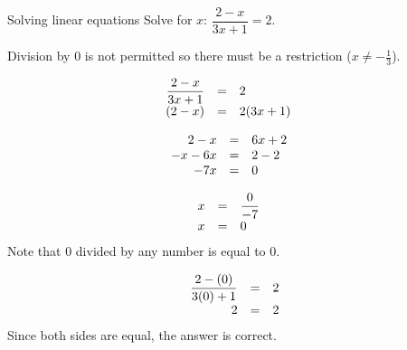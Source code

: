 \begin{wex}{Solving linear equations }
{Solve for $x$: $\dfrac{2-x}{3x+1}=2$.} 
{
Division by $0$ is not permitted so there must be a restriction ($x\neq -\frac{1}{3}$).

\begin{equation*}
    \begin{array}{ccll}\hfill \dfrac{2-x}{3x+1}& =& 2\hfill & \\
	\hfill (2-x)& =& 2(3x+1)\hfill & \\ 
    \end{array}
\end{equation*}

\begin{equation*}
    \begin{array}{ccll}
	\hfill 2-x& =& 6x+2\hfill & \hfill \\ 
	\hfill -x-6x& =& 2-2\hfill & \hfill \\ 
	\hfill -7x& =& 0\hfill & \hfill
    \end{array}
\end{equation*}

\begin{equation*}
    \begin{array}{ccll}

	\hfill x& =& \dfrac{0}{-7}\hfill & \\
	\hfill x& =& 0\hfill & \hfill 
    \end{array}
\end{equation*}
Note that $0$ divided by any number is equal to $0$.


\begin{equation*}
    \begin{array}{ccc}\hfill \dfrac{2-(0)}{3(0)+1}& =& 2\hfill\\
	\hfill 2& =& 2\hfill 
\end{array}
\end{equation*}
Since both sides are equal, the answer is correct.
}
\end{wex}


